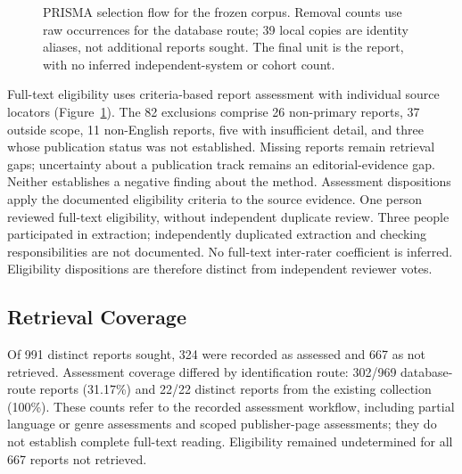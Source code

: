 \documentclass[manuscript,review,screen]{acmart}
\begin{document}
\begin{figure}[htbp]
\caption{PRISMA selection flow for the frozen corpus. Removal counts use raw occurrences for the database route; 39 local copies are identity aliases, not additional reports sought. The final unit is the report, with no inferred independent-system or cohort count.}
\label{fig:prisma}
\end{figure}

Full-text eligibility uses criteria-based report assessment with individual source locators (Figure~\ref{fig:prisma}). The 82 exclusions comprise 26 non-primary reports, 37 outside scope, 11 non-English reports, five with insufficient detail, and three whose publication status was not established. Missing reports remain retrieval gaps; uncertainty about a publication track remains an editorial-evidence gap. Neither establishes a negative finding about the method. Assessment dispositions apply the documented eligibility criteria to the source evidence. One person reviewed full-text eligibility, without independent duplicate review. Three people participated in extraction; independently duplicated extraction and checking responsibilities are not documented. No full-text inter-rater coefficient is inferred. Eligibility dispositions are therefore distinct from independent reviewer votes.

\subsection{Retrieval Coverage}
\label{sec:retrieval-coverage-proposal}

Of 991 distinct reports sought, 324 were recorded as assessed and 667 as not retrieved. Assessment coverage differed by identification route: 302/969 database-route reports (31.17\%) and 22/22 distinct reports from the existing collection (100\%). These counts refer to the recorded assessment workflow, including partial language or genre assessments and scoped publisher-page assessments; they do not establish complete full-text reading. Eligibility remained undetermined for all 667 reports not retrieved.
\end{document}
